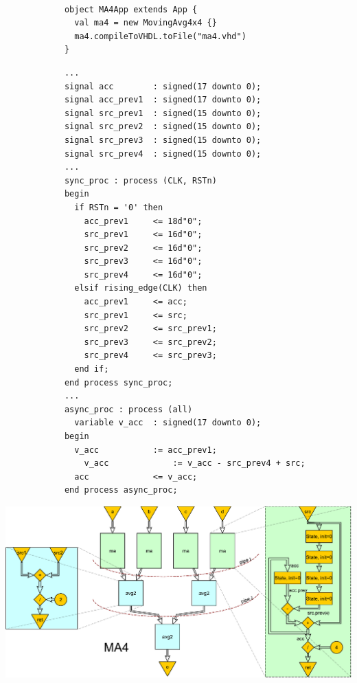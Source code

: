 \begin{table}[t!]
\begin{minipage}[t][12cm][t]{0.50\linewidth}
\begin{verbatim}
			
			object MA4App extends App {
			  val ma4 = new MovingAvg4x4 {}
			  ma4.compileToVHDL.toFile("ma4.vhd")
			}
    \end{verbatim}
    \label{fig:MADFiant}
  \end{minipage}
  \hfill
  \begin{minipage}[t][12cm][t]{0.49\linewidth}
    \centering
    \captionsetup{justification=centering}
		\begin{verbatim}
			...
			signal acc        : signed(17 downto 0);
			signal acc_prev1  : signed(17 downto 0);
			signal src_prev1  : signed(15 downto 0);
			signal src_prev2  : signed(15 downto 0);
			signal src_prev3  : signed(15 downto 0);
			signal src_prev4  : signed(15 downto 0);
			...
			sync_proc : process (CLK, RSTn)
			begin
			  if RSTn = '0' then
			    acc_prev1     <= 18d"0";
			    src_prev1     <= 16d"0";
			    src_prev2     <= 16d"0";
			    src_prev3     <= 16d"0";
			    src_prev4     <= 16d"0";
			  elsif rising_edge(CLK) then
			    acc_prev1     <= acc;
			    src_prev1     <= src;
			    src_prev2     <= src_prev1;
			    src_prev3     <= src_prev2;
			    src_prev4     <= src_prev3;
			  end if;
			end process sync_proc;
			...
			async_proc : process (all)
			  variable v_acc  : signed(17 downto 0);
			begin
			  v_acc           := acc_prev1;
				v_acc 		      := v_acc - src_prev4 + src;
			  acc             <= v_acc;
			end process async_proc;
    \end{verbatim}
    \label{fig:MAVHDL}
  \end{minipage}
  \vfill
  \includegraphics[width=\linewidth]{graphics/ma.pdf}

\end{table}
